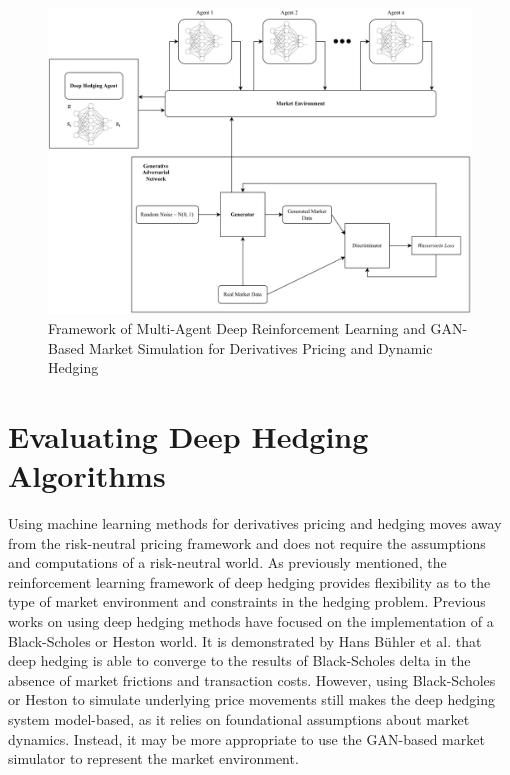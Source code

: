 \begin{figure}[h]
\centering
\includegraphics[width=14cm]{templates/assets/drl/rl_gan_combined.png}
\caption{Framework of Multi-Agent Deep Reinforcement Learning and GAN-Based Market Simulation for Derivatives Pricing and Dynamic Hedging}
\end{figure}

\section{Evaluating Deep Hedging Algorithms}
Using machine learning methods for derivatives pricing and hedging moves away from the risk-neutral pricing framework and does not require the assumptions and computations of a risk-neutral world. As previously mentioned, the reinforcement learning framework of deep hedging provides flexibility as to the type of market environment and constraints in the hedging problem. Previous works on using deep hedging methods have focused on the implementation of a Black-Scholes or Heston world. It is demonstrated by Hans Bühler et al. \cite{deep-hedging} that deep hedging is able to converge to the results of Black-Scholes delta in the absence of market frictions and transaction costs. However, using Black-Scholes or Heston to simulate underlying price movements still makes the deep hedging system model-based, as it relies on foundational assumptions about market dynamics. Instead, it may be more appropriate to use the GAN-based market simulator to represent the market environment.

